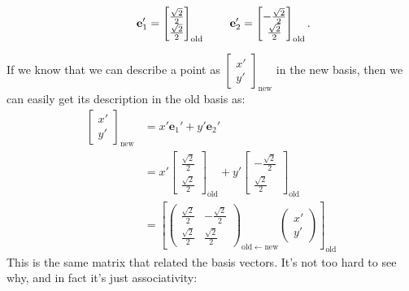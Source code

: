 \documentclass[../master.tex]{subfiles}
\begin{document}
	\begin{equation*}
		\hspace{.3in}\mathbf e_1' = \begin{bmatrix}
			\frac{\sqrt 2}{2} \\ \frac{\sqrt 2}{2}
		\end{bmatrix}_{\mathrm{old}} \hspace{0.3in}
		\mathbf e_2' = \begin{bmatrix}
			-\frac{\sqrt 2}{2} \\ \frac{\sqrt 2}{2}
		\end{bmatrix}_{\mathrm{old}}.
	\end{equation*}
		
	If we know that we can describe a point as \small{$\begin{bmatrix}
					x' \\ y'
		\end{bmatrix}_{\text{new}}$}
	in the new basis, then we can easily get its description in the old basis as:
	\begin{equation*}
		\begin{aligned}
			\begin{bmatrix}
						x' \\ y'
			\end{bmatrix}_{\mathrm{new}} 
			&= x' \mathbf e_1' + y' \mathbf e_2' \\
			&= x' \begin{bmatrix}
				\frac{\sqrt 2}{2} \\ \frac{\sqrt 2}{2}
			\end{bmatrix}_{\mathrm{old}} 
			+ y' \begin{bmatrix}
				-\frac{\sqrt 2}{2} \\ \frac{\sqrt 2}{2}
			\end{bmatrix}_{\mathrm{old}}
			\\ &=\left[ \begin{pmatrix}
				 \frac{\sqrt 2}{2} &  -\frac{\sqrt 2}{2} \\
				 \frac{\sqrt 2}{2} &  \frac{\sqrt 2}{2}
			\end{pmatrix}_{\mathrm{old} \leftarrow \mathrm{new}}
			\begin{pmatrix}
						x' \\ y'
			\end{pmatrix} \right]_{\mathrm{old}} 
		\end{aligned}
	\end{equation*}
	This is the same matrix that related the basis vectors. It's not too hard to see why, and in fact it's just associativity:
\end{document}
